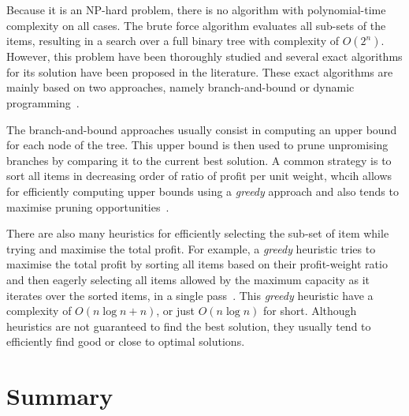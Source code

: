 Because it is an NP-hard problem, there is no algorithm with polynomial-time complexity on all cases.
The brute force algorithm evaluates all sub-sets of the items, resulting in a search over a full binary tree with complexity of $O(2^n)$.
However, this problem have been thoroughly studied and several exact algorithms for its solution have been proposed in the literature.
These exact algorithms are mainly based on two approaches, namely branch-and-bound or dynamic programming~\citep{martello77,martello99}.

The branch-and-bound approaches usually consist in computing an upper bound for each node of the tree.
This upper bound is then used to prune unpromising branches by comparing it to the current best solution.
A common strategy is to sort all items in decreasing order of ratio of profit per unit weight, whcih allows for efficiently computing upper bounds using a \textit{greedy} approach and also tends to maximise pruning opportunities~\citep{martello77,martello00}.

There are also many heuristics for efficiently selecting the sub-set of item while trying and maximise the total profit.
For example, a \textit{greedy} heuristic tries to maximise the total profit by sorting all items based on their profit-weight ratio and then eagerly selecting all items allowed by the maximum capacity as it iterates over the sorted items, in a single pass~\citep{dantzig57}.
This \textit{greedy} heuristic have a complexity of $O(n\log{n} + n)$, or just $O(n\log{n})$ for short.
Although heuristics are not guaranteed to find the best solution, they usually tend to efficiently find good or close to optimal solutions.

\section{Summary}
